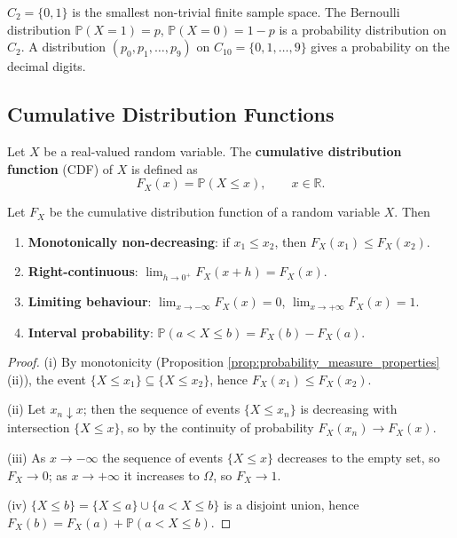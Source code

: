 \begin{example}\label{ex:finite_sample_space}
$C_2 = \{0, 1\}$ is the smallest non-trivial finite sample space. The Bernoulli distribution $\mathbb{P}(X=1) = p$, $\mathbb{P}(X=0) = 1-p$ is a probability distribution on $C_2$. A distribution $(p_0, p_1, \dots, p_9)$ on $C_{10} = \{0, 1, \dots, 9\}$ gives a probability on the decimal digits.
\end{example}

\subsection{Cumulative Distribution Functions}

\begin{definition}\label{def:cdf}
Let $X$ be a real-valued random variable. The \textbf{cumulative distribution function} (CDF) of $X$ is defined as
\[
F_X(x) = \mathbb{P}(X \le x), \qquad x \in \mathbb{R}.
\]
\end{definition}

\begin{property}\label{prop:cdf_properties}
Let $F_X$ be the cumulative distribution function of a random variable $X$. Then
\begin{enumerate}[label=(\roman*)]
    \item \textbf{Monotonically non-decreasing}: if $x_1 \le x_2$, then $F_X(x_1) \le F_X(x_2)$.
    \item \textbf{Right-continuous}: $\lim_{h \to 0^+} F_X(x+h) = F_X(x)$.
    \item \textbf{Limiting behaviour}: $\lim_{x \to -\infty} F_X(x) = 0$, $\lim_{x \to +\infty} F_X(x) = 1$.
    \item \textbf{Interval probability}: $\mathbb{P}(a < X \le b) = F_X(b) - F_X(a)$.
\end{enumerate}
\end{property}

\begin{proof}
(i) By monotonicity (Proposition \ref{prop:probability_measure_properties} (ii)), the event $\{X \le x_1\} \subseteq \{X \le x_2\}$, hence $F_X(x_1) \le F_X(x_2)$.

(ii) Let $x_n \downarrow x$; then the sequence of events $\{X \le x_n\}$ is decreasing with intersection $\{X \le x\}$, so by the continuity of probability $F_X(x_n) \to F_X(x)$.

(iii) As $x \to -\infty$ the sequence of events $\{X \le x\}$ decreases to the empty set, so $F_X \to 0$; as $x \to +\infty$ it increases to $\Omega$, so $F_X \to 1$.

(iv) $\{X \le b\} = \{X \le a\} \cup \{a < X \le b\}$ is a disjoint union, hence $F_X(b) = F_X(a) + \mathbb{P}(a < X \le b)$.
\end{proof}

